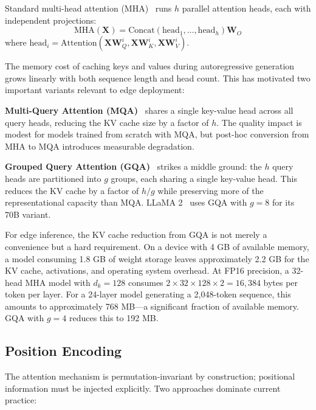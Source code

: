 \documentclass[12pt, letterpaper, twoside]{report}
\begin{document}
Standard multi-head attention (MHA)~\cite{vaswani2017attention} runs $h$ parallel attention heads, each with independent projections:
\begin{equation}
\text{MHA}(\mathbf{X}) = \text{Concat}(\text{head}_1, \ldots, \text{head}_h)\mathbf{W}_O
\end{equation}
where $\text{head}_i = \text{Attention}(\mathbf{X}\mathbf{W}_Q^i, \mathbf{X}\mathbf{W}_K^i, \mathbf{X}\mathbf{W}_V^i)$.

The memory cost of caching keys and values during autoregressive generation grows linearly with both sequence length and head count. This has motivated two important variants relevant to edge deployment:

\textbf{Multi-Query Attention (MQA)}~\cite{shazeer2019fast} shares a single key-value head across all query heads, reducing the KV cache size by a factor of $h$. The quality impact is modest for models trained from scratch with MQA, but post-hoc conversion from MHA to MQA introduces measurable degradation.

\textbf{Grouped Query Attention (GQA)}~\cite{ainslie2023gqa} strikes a middle ground: the $h$ query heads are partitioned into $g$ groups, each sharing a single key-value head. This reduces the KV cache by a factor of $h/g$ while preserving more of the representational capacity than MQA. LLaMA 2~\cite{touvron2023llama2} uses GQA with $g = 8$ for its 70B variant.

For edge inference, the KV cache reduction from GQA is not merely a convenience but a hard requirement. On a device with 4 GB of available memory, a model consuming 1.8 GB of weight storage leaves approximately 2.2 GB for the KV cache, activations, and operating system overhead. At FP16 precision, a 32-head MHA model with $d_k = 128$ consumes $2 \times 32 \times 128 \times 2 = 16{,}384$ bytes per token per layer. For a 24-layer model generating a 2,048-token sequence, this amounts to approximately 768 MB---a significant fraction of available memory. GQA with $g = 4$ reduces this to 192 MB.

\subsection{Position Encoding}
\label{subsec:position}

The attention mechanism is permutation-invariant by construction; positional information must be injected explicitly. Two approaches dominate current practice:
\end{document}

